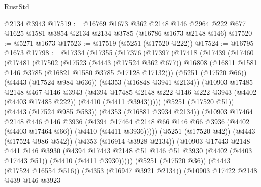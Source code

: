 \begin{lexlean}{RustStd}
\begin{coremodule}
    @2134
    @3943
@17519 := @16769
    @1673
    @362
    @2148
    @146
    @2964
    @222
    @677
    @1625
    @1581
    @3854
    @2134
    @2134
    @3785
    (@16786 @1673 @2148 @146)
@17520 := @5271 @1673
@17523 := @17519 (@5251 (@17520 @222))
@17524 := @16795 @1673
@17798 := @17334
    (@17355
      (@17376
        (@17397
          (@17418
            (@17439
              (@17460
                (@17481
                  (@17502
                    (@17523
                      (@4443 (@17524 @362 @677))
                      @16808
                      (@16811 @1581 @146 @3785 (@16821 @1580 @3785 @17128 @17132)))
                    (@5251 (@17520 @66))
                    (@4443 (@17524 @984 @636))
                    (@4353 (@16848 @3941 @2134))
                    (@10903
                      @17485
                      @2148
                      @467
                      @146
                      @3943
                      (@4394
                        @17485
                        @2148
                        @222
                        @146
                        @222
                        @3943
                        (@4402 (@4403 @17485 @222))
                        (@4410 (@4411 @3943)))))
                  (@5251 (@17520 @51))
                  (@4443 (@17524 @985 @583))
                  (@4353 (@16881 @3934 @2134))
                  (@10903
                    @17464
                    @2148
                    @446
                    @146
                    @3936
                    (@4394
                      @17464
                      @2148
                      @66
                      @146
                      @66
                      @3936
                      (@4402 (@4403 @17464 @66))
                      (@4410 (@4411 @3936)))))
                (@5251 (@17520 @42))
                (@4443 (@17524 @986 @542))
                (@4353 (@16914 @3928 @2134))
                (@10903
                  @17443
                  @2148
                  @441
                  @146
                  @3930
                  (@4394
                    @17443
                    @2148
                    @51
                    @146
                    @51
                    @3930
                    (@4402 (@4403 @17443 @51))
                    (@4410 (@4411 @3930)))))
              (@5251 (@17520 @36))
              (@4443 (@17524 @16554 @516))
              (@4353 (@16947 @3921 @2134))
              (@10903
                @17422
                @2148
                @439
                @146
                @3923

\end{coremodule}
\end{lexlean}
